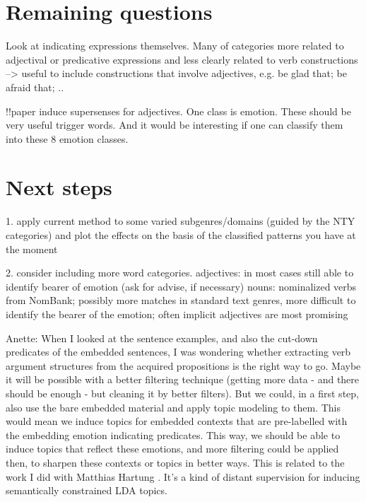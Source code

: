 \section{Remaining questions}

Look at indicating expressions themselves.
Many of categories more related to adjectival or predicative expressions and less clearly related to verb constructions
--> useful to include constructions that involve adjectives, e.g. be glad that; be afraid that; ..

!!paper \citep{adjective_supersenses} induce supersenses for adjectives. One class is emotion. These should be very useful trigger words. And it would be interesting if one can classify them into these 8 emotion classes. 



\section{Next steps}

1. apply current method to some varied subgenres/domains (guided by the NTY categories) and plot the effects on the basis of the classified patterns you have at the moment

2. consider including more word categories.
adjectives: in most cases still able to identify bearer of emotion (ask for advise, if necessary)
nouns: nominalized verbs from NomBank; possibly more matches in standard text genres, more difficult to identify the bearer of the emotion; often implicit
adjectives are most promising

Anette:
When I looked at the sentence examples, and also the cut-down predicates of the embedded sentences, I was wondering whether extracting verb argument structures from the acquired propositions is the right way to go. Maybe it will be possible with a better filtering technique (getting more data - and there should be enough - but cleaning it by better filters). But we could, in a first step, also use the bare embedded material and apply topic modeling to them. This would mean we induce topics for embedded contexts that are pre-labelled with the embedding emotion indicating predicates. This way, we should be able to induce topics that reflect these emotions, and more filtering could be applied then, to sharpen these contexts or topics in better ways. This is related to the work I did with Matthias Hartung \cite{hartung2011exploring}. It's a kind of distant supervision for inducing semantically constrained LDA topics.

